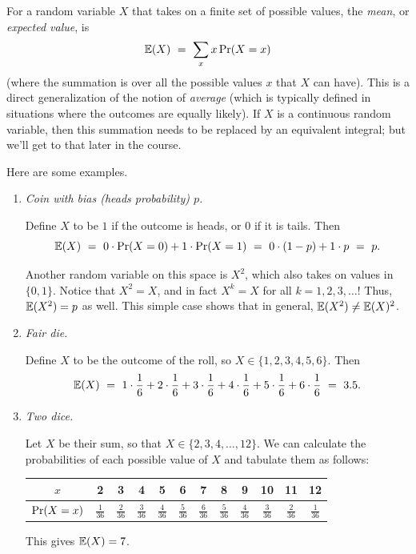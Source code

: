 For a random variable $X$ that takes on a finite set of possible values, the 
{\it mean}, or {\it expected value}, is
$$ \mathbb{E}(X) \ = \ \sum_{x} x \, \mbox{\rm Pr}(X = x) $$
(where the summation is over all the possible values $x$ that $X$ can have). This
is a direct generalization of the notion of {\it average} (which is typically
defined in situations where the outcomes are equally likely). If $X$ is a continuous 
random variable, then this summation needs to be replaced by an equivalent integral; 
but we'll get to that later in the course.

Here are some examples.
\begin{enumerate}
\item {\it Coin with bias (heads probability) $p$.}

Define $X$ to be $1$ if the outcome is heads, or $0$ if it is tails. Then 
$$ \E(X) 
\ = \ 
0 \cdot \pr(X = 0) + 1 \cdot \pr(X = 1)  
\ = \ 
0 \cdot (1-p) + 1 \cdot p
\ = \ 
p .
$$

Another random variable on this space is $X^2$, which also takes on values in $\{0,1\}$.
Notice that $X^2 = X$, and in fact $X^k = X$ for all $k = 1,2,3,\ldots$! Thus, 
$\mathbb{E}(X^2) = p$ as well. This simple case shows that in general, $\mathbb{E}(X^2) \neq \mathbb{E}(X)^2$.

\item {\it Fair die.}

Define $X$ to be the outcome of the roll, so $X \in \{1,2,3,4,5,6\}$. Then
$$ \E(X) 
\ = \ 
1 \cdot \frac{1}{6} + 2 \cdot \frac{1}{6} + 3 \cdot \frac{1}{6} + 4 \cdot \frac{1}{6}
+ 5 \cdot \frac{1}{6} + 6 \cdot \frac{1}{6} 
\ = \ 
3.5.$$

\item {\it Two dice.}

Let $X$ be their sum, so that $X \in \{2,3,4,\ldots, 12\}$. We can calculate the probabilities
of each possible value of $X$ and tabulate them as follows:

\begin{center}
\begin{tabular}{c|c|c|c|c|c|c|c|c|c|c|c}
$x$          & 2 & 3 & 4 & 5 & 6 & 7 & 8 & 9 & 10 & 11 & 12 \\ \hline
$\mbox{\rm Pr}(X = x)$ & $\frac{1}{36}$ & $\frac{2}{36}$ & $\frac{3}{36}$ & $\frac{4}{36}$ & $\frac{5}{36}$ & $\frac{6}{36}$ & $\frac{5}{36}$ & $\frac{4}{36}$ & $\frac{3}{36}$ & $\frac{2}{36}$ & $\frac{1}{36}$  
\end{tabular}
\end{center}

This gives $\mathbb{E}(X) = 7$.


\end{enumerate}
